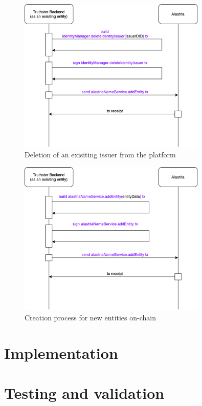 \documentclass[target=mst,aauheader=]{thud}
\begin{document}
\begin{figure}
    \centering
    \includegraphics[width=0.8\textwidth]{images/deleteExistingIssuer.png}
    \caption{Deletion of an exisiting issuer from the platform}
    \label{fig:deleteIssuer}
\end{figure}


\begin{figure}
    \centering
    \includegraphics[width=0.8\textwidth]{images/createNewGeneralEntity.png}
    \caption{Creation process for new entities on-chain}
\end{figure}


\chapter{Implementation}

\chapter{Testing and validation}
\end{document}
